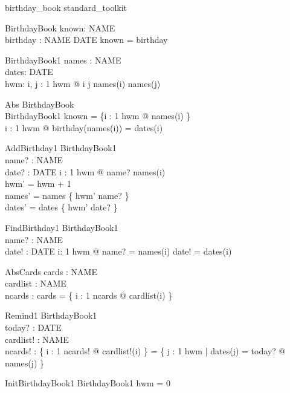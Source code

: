 \documentclass{llncs}
\begin{document}
\begin{zsection}
\SECTION birthday\_book \parents standard\_toolkit
\end{zsection}

\begin{zed}
\end{zed}
\begin{schema}{BirthdayBook}
known: \power NAME \\
birthday : NAME \pfun DATE
\where
known = \dom birthday
\end{schema}
\begin{schema}{BirthdayBook1}
names : \nat \fun NAME \\
dates: \nat \fun DATE \\
hwm: \nat
\where
\forall i, j : 1 \upto hwm @ i \neq j \implies names(i) \neq names(j)
\end{schema}
\begin{schema}{Abs}
BirthdayBook \\
BirthdayBook1
\where
known = \{i : 1 \upto hwm @ names(i) \} \\
\forall i : 1 \upto hwm @ birthday(names(i)) = dates(i)
\end{schema}

\begin{schema}{AddBirthday1}
\Delta BirthdayBook1 \\
name? : NAME \\
date? : DATE
\where
\forall i : 1 \upto hwm @ name? \neq names(i) \\
hwm' = hwm + 1 \\
names' = names \oplus \{ hwm' \mapsto name? \} \\
dates' = dates \oplus \{ hwm' \mapsto date? \}
\end{schema}

\begin{schema}{FindBirthday1}
\Xi BirthdayBook1 \\
name? : NAME \\
date! : DATE
\where
\exists i: 1 \upto hwm @ name? = names(i) \land date! = dates(i)
\end{schema}

\begin{schema}{AbsCards}
cards : \power NAME \\
cardlist : \nat \fun NAME \\
ncards : \nat
\where
cards = \{ i : 1 \upto ncards @ cardlist(i) \}
\end{schema}

\begin{schema}{Remind1}
\Xi BirthdayBook1 \\
today? : DATE \\
cardlist! : \nat \fun NAME \\
ncards! : \nat
\where
\{ i : 1 \upto ncards! @ cardlist!(i) \} = \{ j : 1 \upto hwm | dates(j) = today? @ names(j) \}
\end{schema}
\begin{schema}{InitBirthdayBook1}
BirthdayBook1
\where
hwm = 0
\end{schema}
\end{document}
